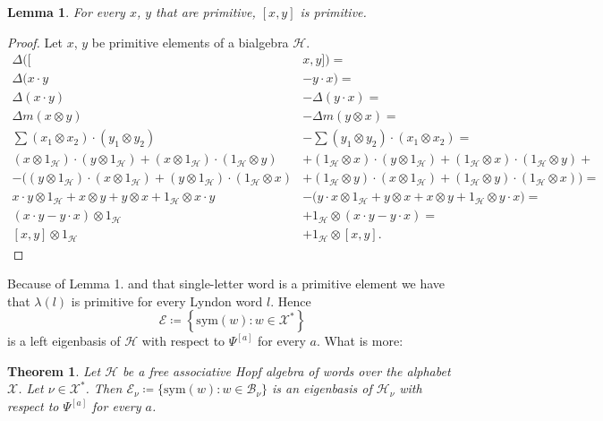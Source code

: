 \documentclass[a4paper, 12pt]{report}
\newtheorem{theorem}{Theorem}
\newtheorem{lemma}{Lemma}
\begin{document}
\begin{lemma}
For every $x$, $y$ that are primitive, $[x, y]$ is primitive.
\end{lemma}

\begin{proof}
Let $x$, $y$ be primitive elements of a bialgebra $\mathcal{H}$.
\begin{align*}
\Delta([&x, y]) = \\ \Delta(x\cdot y &- y\cdot x) =\\ \Delta (x\cdot y) &- \Delta(y\cdot x) =\\ 
\Delta m(x \otimes y) &- \Delta m(y \otimes x) =\\ 
\sum (x_1 \otimes x_2) \cdot (y_1 \otimes y_2) &- \sum (y_1 \otimes y_2) \cdot (x_1 \otimes x_2) = \\
(x \otimes 1_\mathcal{H}) \cdot (y \otimes 1_\mathcal{H}) + (x \otimes 1_\mathcal{H}) \cdot (1_\mathcal{H} 
\otimes y) 
&+ (1_\mathcal{H} \otimes x) \cdot (y \otimes 1_\mathcal{H}) + (1_\mathcal{H} \otimes x) \cdot 
(1_\mathcal{H} \otimes y) + \\
- \Big((y \otimes 1_\mathcal{H}) \cdot (x \otimes 1_\mathcal{H}) + (y \otimes 1_\mathcal{H}) \cdot 
(1_\mathcal{H} \otimes x) 
&+ (1_\mathcal{H} \otimes y) \cdot (x \otimes 1_\mathcal{H}) + (1_\mathcal{H} \otimes y) \cdot 
(1_\mathcal{H} \otimes x) \Big) = \\
x \cdot y \otimes 1_\mathcal{H} + x \otimes y + y \otimes x + 1_\mathcal{H} \otimes x \cdot y 
&- \Big( y \cdot x \otimes 1_\mathcal{H} + y \otimes x + x \otimes y + 1_\mathcal{H} \otimes y \cdot x 
\Big) = \\
(x \cdot y - y \cdot x) \otimes 1_\mathcal{H} &+ 1_\mathcal{H} \otimes (x \cdot y - y \cdot x) = \\
[x, y] \otimes 1_\mathcal{H} &+ 1_\mathcal{H} \otimes [x, y].
\end{align*}

\end{proof}

Because of Lemma 1. and that single-letter word is a primitive element we have that $\lambda(l)$ is primitive 
for every Lyndon word $l$. Hence
\begin{equation*}
\mathcal{E} \coloneqq\left\{\mathrm{sym}(w) : w \in \mathcal{X}^*\right\}
\end{equation*}
is a left eigenbasis of $\mathcal{H}$ with respect to $\Psi^{[a]}$ for every $a$. What is more:

\begin{theorem}
Let $\mathcal{H}$ be a free associative Hopf algebra of words over the alphabet $\mathcal{X}$. 
Let $\nu \in \mathcal{X}^*$. Then $\mathcal{E}_\nu \coloneqq \{\mathrm{sym}(w) : w \in \mathcal{B}_\nu\}$ is 
an eigenbasis of 
$\mathcal{H}_\nu$ with respect to $\Psi^{[a]}$ for every $a$.
\end{theorem}
\end{document}
